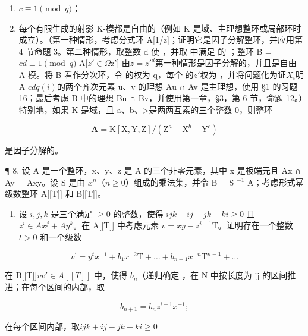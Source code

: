 \begin{enumerate}
\def\labelenumi{(\arabic{enumi})}
\item
  \(c \equiv 1 \pmod{q}\)；
\item
  每个有限生成的射影 K-模都是自由的（例如 K 是域、主理想整环或局部环时成立）。（第一种情形，考虑分式环 A[1/z]；证明它是因子分解整环{}，{并}应用第 4 节命题 3。第二种情形，取整数 d 使 ，并取  中满足  的 ；整环 B =\(cd \equiv 1 \pmod{q}\) A[\(z' \in \Omega\)z'] 由\(z = z'^{d}\)第一种情形是因{}子{}分解的，并且是自由 A-模。将 B 看作分次环，令  的权为 q，每个  的\(z'\)权为 ，并将问题化为证\(X_{i}\)明 A \(cdq(i)\)的两个齐次元素 u、v 的理想 Au ∩ Av 是主理想，使用 §1 的习题 16；最后考虑 B 中的理想 Bu ∩ Bv，并使用第一章，§3，第 6 节，命题 12。）特别地，如果 K 是域，且 a、b、\textgreater 是两两互素的三个整数 0，则整环
\end{enumerate}

\[
\mathbf {A} = \mathrm{K} [ \mathrm{X}, \mathrm{Y}, \mathrm{Z} ] / (\mathrm{Z} ^ {a} - \mathrm{X} ^ {b} - \mathrm{Y} ^ {c})
\]

是因子分解的。

¶ 8. 设 A 是一个整环，x、y、z 是 A 的三个非零元素，其中 x 是极端元且 Ax ∩ Ay = Axy。设 S 是由 \(x^{n}\)（\(n \geqslant 0\)）组成的乘法集，并令 B = S \(^{-1}\) A；考虑形式幂级数整环 A{[}{[}T{]}{]} 和 B{[}{[}T{]}{]}。

\begin{enumerate}
\def\labelenumi{(\alph{enumi})}
\tightlist
\item
    设 \(i, j, k\) 是三个满足 \(\geqslant 0\) 的整数，使得 \(ijk - ij - jk - ki \geqslant 0\) 且 \(z^i \in Ax^j + Ay^k\)。在 A{[}{[}T{]}{]} 中考虑元素 \(v = xy - z^{i-1}\mathrm{T}\)。证明存在一个整数 \(t > 0\) 和一个级数
\end{enumerate}

\[
v ^ {\prime} = y ^ {t} x ^ {- 1} + b _ {1} x ^ {- 2} \mathrm{T} + \dots + b _ {n - 1} x ^ {- n} \mathrm{T} ^ {n - 1} + \dots
\]

在 {}{}B{}{}[[T]]\(vv' \in A[[T]]\) 中，使得 \(b_{n}\)（递归确定 ，在 N 中按长度为 ij 的区间推进；在每个区间的内部，取

\[
b _ {n + 1} = b _ {n} z ^ {i - 1} x ^ {- 1};
\]

在每个区间内部，取\(ijk + ij - jk - ki \geqslant 0\) 

